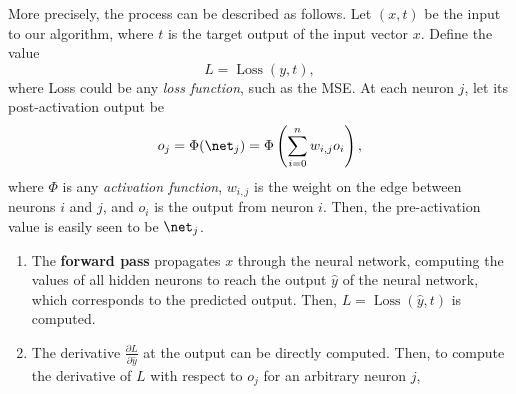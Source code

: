\documentclass{article}
\begin{document}
  More precisely, the process can be described as follows. Let $(x,t)$ be the input to our algorithm, where $t$ is the target output of the input vector $x.$ Define the value
  $$L = \operatorname{Loss}(y,t),$$
  where Loss could be any \textit{loss function}, such as the MSE. At each neuron $j$, let its post-activation output be 
  $$o_j = \Phi (\net_j) = \Phi \left( \sum^{n}_{i=0}w_{i,j} o_i  \right) , $$
  where $\Phi$ is any \textit{activation function}, $w_{i,j}$ is the weight on the edge between neurons $i$ and $j$, and $o_i$ is the output from neuron $i.$ Then, the pre-activation value is easily seen to be $\net_j$.

  \begin{enumerate}
    \item The \textbf{forward pass} propagates $x$ through the neural network, computing the values of all hidden neurons to reach the output $\hat y$ of the neural network, which corresponds to the predicted output. Then, $L = \operatorname{Loss}(\hat y, t)$  is computed.
    \item The derivative $\frac{\partial {L}}{\partial {\hat y}}$ at the output can be directly computed. Then, to compute the derivative of $L$ with respect to $o_j$ for an arbitrary neuron $j$, 


\end{enumerate}
\end{document}
